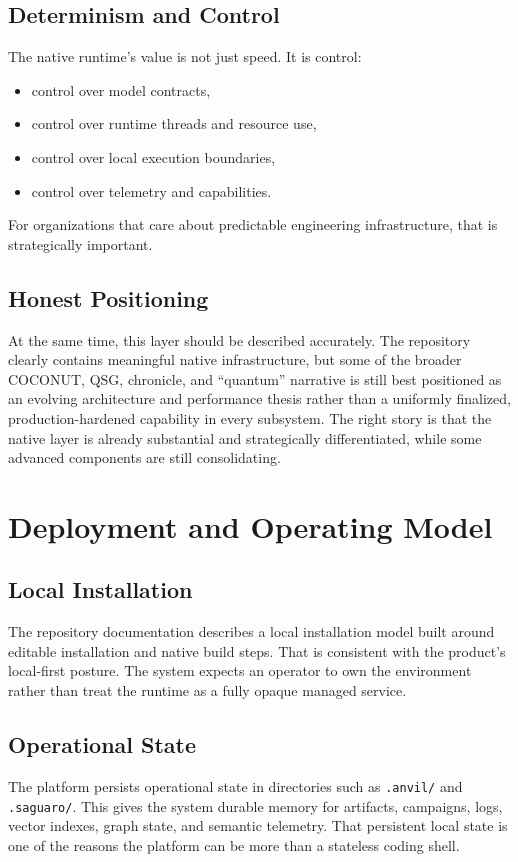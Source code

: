 \documentclass[11pt,a4paper]{article}
\begin{document}
\subsection{Determinism and Control}
The native runtime's value is not just speed. It is control:
\begin{itemize}
    \item control over model contracts,
    \item control over runtime threads and resource use,
    \item control over local execution boundaries,
    \item control over telemetry and capabilities.
\end{itemize}

For organizations that care about predictable engineering infrastructure, that is strategically important.

\subsection{Honest Positioning}
At the same time, this layer should be described accurately. The repository clearly contains meaningful native infrastructure, but some of the broader COCONUT, QSG, chronicle, and ``quantum'' narrative is still best positioned as an evolving architecture and performance thesis rather than a uniformly finalized, production-hardened capability in every subsystem. The right story is that the native layer is already substantial and strategically differentiated, while some advanced components are still consolidating.

\section{Deployment and Operating Model}
\subsection{Local Installation}
The repository documentation describes a local installation model built around editable installation and native build steps. That is consistent with the product's local-first posture. The system expects an operator to own the environment rather than treat the runtime as a fully opaque managed service.

\subsection{Operational State}
The platform persists operational state in directories such as \texttt{.anvil/} and \texttt{.saguaro/}. This gives the system durable memory for artifacts, campaigns, logs, vector indexes, graph state, and semantic telemetry. That persistent local state is one of the reasons the platform can be more than a stateless coding shell.
\end{document}

